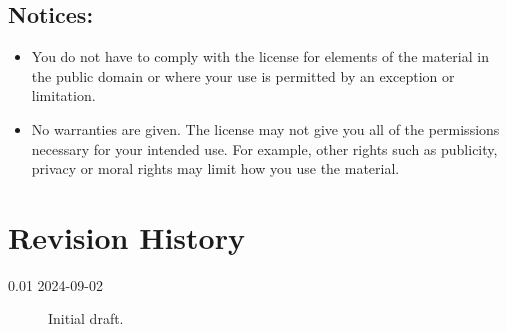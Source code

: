 \documentclass[letterpaper,twoside]{article}
\begin{document}
\subsection{Notices:}
\begin{itemize}
\item{You do not have to comply with the license for elements of the
  material in the public domain or where your use is permitted by an
  exception or limitation.}
\item{No warranties are given.  The license may not give you all of the
  permissions necessary for your intended use.  For example, other rights
  such as publicity, privacy or moral rights may limit how you use the
  material.}
\end{itemize}

\section{Revision History}

\begin{description}
  \item[0.01 2024-09-02]Initial draft.
\end{description}


\end{document}
